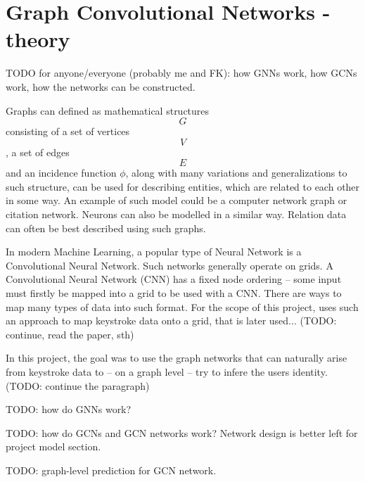 
\chapter{Graph Convolutional Networks - theory}

TODO for anyone/everyone (probably me and FK): how GNNs work, how GCNs work, how the networks can be constructed.

Graphs can defined as mathematical structures $$G$$ consisting of a set of vertices $$V$$, a set of edges $$E$$ and an incidence function $\phi$, along with many variations and generalizations to such structure, can be used for describing entities, which are related to each other in some way. An example of such model could be a computer network graph or citation network. Neurons can also be modelled in a similar way. Relation data can often be best described using such graphs. \cite{Lesk2024}

In modern Machine Learning, a popular type of Neural Network is a Convolutional Neural Network. Such networks generally operate on grids. A Convolutional Neural Network (CNN) has a fixed node ordering -- some input must firstly be mapped into a grid to be used with a CNN. There are ways to map many types of data into such format. For the scope of this project, \cite{Shar2023} uses such an approach to map keystroke data onto a grid, that is later used... (TODO: continue, read the paper, sth)

In this project, the goal was to use the graph networks that can naturally arise from keystroke data to -- on a graph level -- try to infere the users identity. (TODO: continue the paragraph)

TODO: how do GNNs work?

TODO: how do GCNs and GCN networks work? Network design is better left for project model section.

TODO: graph-level prediction for GCN network.